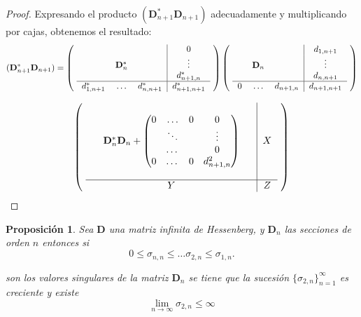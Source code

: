 \documentclass[11pt]{article}
\newtheorem{prop1}{Proposici\'{o}n}%
\newenvironment{prop}{\begin{prop1}\rm}{\end{prop1}}
\begin{document}
 \begin{proof} Expresando el producto $(\mathbf{D}_{n+1}^{*}\mathbf{D}_{n+1})$ adecuadamente y multiplicando por cajas, obtenemos el resultado: 
    \[ (\mathbf{D}_{n+1}^{*}\mathbf{D}_{n+1}) = 
\left (   \mbox{
\begin{tabular}{ccc|c}
& $$ &  & $0$ \\
$$ & $\mathbf{D}_{n}^{*}$ &  & $\vdots$ \\
&  &  &$d_{n+1,n}^*$ \\  \hline

$d_{1,n+1}^*$ & $\ldots$ & $d_{n,n+1}^*$  & $d_{n+1,n+1}^*$ \\
\end{tabular}
} \right ) \left (   \mbox{
\begin{tabular}{ccc|c}
& $$ &  & $d_{1,n+1}$ \\
$$ & $\mathbf{D}_{n}$ &  & $\vdots$ \\
&  &  &$d_{n,n+1}$ \\  \hline

$0$ & $\ldots$ & $d_{n+1,n}$  & $d_{n+1,n+1}$ \\
\end{tabular}
} \right ) 
\]

\[
\left (   \mbox{
\begin{tabular}{ccc|c}
& $$ &  & \\
$$ & $\mathbf{D}_{n}^{*}\mathbf{D}_{n}+\begin{pmatrix}
0 & \ldots&0 & 0\\
 & \ddots& & \vdots\\
  & \dots& & 0\\
0 & \dots& 0 & d_{n+1,n}^2

\end{pmatrix}$ &  & $X$ \\
&  &  &$$ \\  \hline

$$ & $Y$ & $$  & $Z$ \\
\end{tabular}
} \right ) 
\]   
 
\end{proof}

\begin{prop} Sea $\mathbf{D}$ una matriz infinita de Hessenberg, y $\mathbf{D}_n$ las secciones de orden $n$ entonces si $$
0 \leq \sigma_{n,n}\leq \dots \sigma_{2,n} \leq \sigma_{1,n}.
$$

\noindent son los valores singulares de la matriz $\mathbf{D}_n$ se tiene que 
la sucesión $\{\sigma_{2,n}\}_{n=1}^{\infty}$ es creciente y existe
$$
\lim_{n\to \infty} \sigma_{2,n} \leq \infty
$$


\end{prop} 
\end{document}
